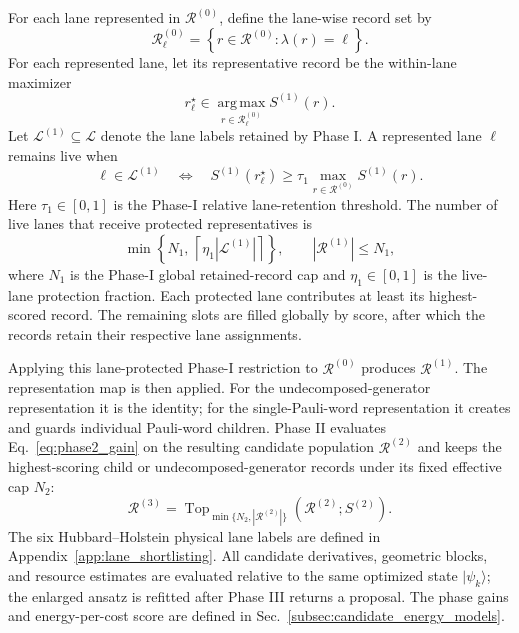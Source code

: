 \documentclass[
  reprint,
  amsmath,
  amssymb,
  aps,
  pra,
  nofootinbib,
  superscriptaddress,
  floatfix
]{revtex4-2}
\newcommand{\ket}[1]{|#1\rangle}
\begin{document}
For each lane represented in \(\mathcal R^{(0)}\), define the lane-wise
record set by
\begin{equation*}
\mathcal R_{\ell}^{(0)}
=
\left\{
r\in\mathcal R^{(0)}
:
\lambda(r)=\ell
\right\}.
\end{equation*}
For each represented lane, let its representative record be the within-lane
maximizer
\[
r_{\ell}^{\star}
\in
\operatorname*{arg\,max}_{r\in\mathcal R_{\ell}^{(0)}}
S^{(1)}(r).
\]
Let \(\mathcal L^{(1)}\subseteq\mathcal L\) denote the lane labels retained
by Phase I. A represented lane \(\ell\) remains live when
\begin{equation}
\ell\in\mathcal L^{(1)}
\quad\Longleftrightarrow\quad
S^{(1)}(r_{\ell}^{\star})
\ge
\tau_1
\max_{r\in\mathcal R^{(0)}}S^{(1)}(r).
\label{eq:phase_restriction_map}
\end{equation}
Here \(\tau_1\in[0,1]\) is the Phase-I relative lane-retention threshold.
The number of live lanes that receive protected representatives is
\begin{equation}
\min\left\{
N_1,\,
\left\lceil \eta_1|\mathcal L^{(1)}|\right\rceil
\right\},
\qquad
|\mathcal R^{(1)}|\le N_1 ,
\label{eq:phase_lane_budget}
\end{equation}
where \(N_1\) is the Phase-I global retained-record cap and
\(\eta_1\in[0,1]\) is the live-lane protection fraction. Each protected lane
contributes at least its highest-scored record. The remaining slots are filled
globally by score, after which the records retain their respective lane
assignments.

Applying this lane-protected Phase-I restriction to \(\mathcal R^{(0)}\)
produces \(\mathcal R^{(1)}\). The representation map is then applied. For
the undecomposed-generator representation it is the identity;
for the single-Pauli-word representation it creates and guards individual
Pauli-word children. Phase II evaluates
Eq.~\eqref{eq:phase2_gain} on the resulting candidate population
\(\mathcal R^{(2)}\) and keeps the highest-scoring child or undecomposed-generator
records under its fixed effective cap \(N_2\):
\begin{equation*}
\mathcal R^{(3)}
=\operatorname{Top}_{\min\{N_2,|\mathcal R^{(2)}|\}}
\left(\mathcal R^{(2)};S^{(2)}\right).
\end{equation*}
The six Hubbard--Holstein physical lane labels are defined in
Appendix~\ref{app:lane_shortlisting}. All candidate derivatives, geometric
blocks, and resource estimates are evaluated relative to the same optimized
state \(\ket{\psi_k}\); the enlarged ansatz is refitted after Phase III
returns a proposal. The phase gains and energy-per-cost score are defined in
Sec.~\ref{subsec:candidate_energy_models}.
\end{document}
